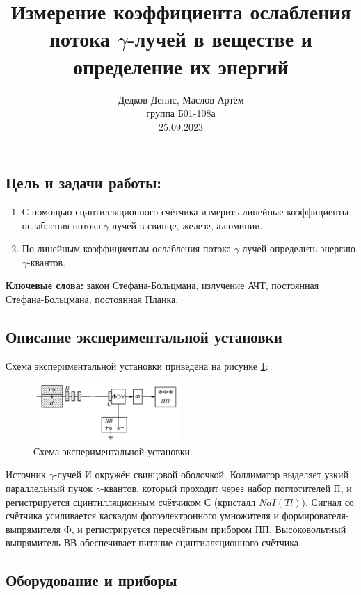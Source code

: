 \documentclass[10pt,a4paper]{article}
\author{\normalsize Дедков Денис, Маслов Артём \\
	\normalsize группа Б01-108а \\
	\normalsize 25.09.2023}
\date{}
\title{
	\Large Измерение коэффициента ослабления потока $\gamma$-лучей в веществе и определение их энергий \\ 
}
\begin{document}
\maketitle
	
	\subsection*{Цель и задачи работы:}
	\begin{enumerate}
		\item С помощью сцинтилляционного счётчика измерить линейные коэффициенты ослабления потока $\gamma$-лучей в свинце, железе, алюминии.
		
		\item По линейным коэффициентам ослабления потока $\gamma$-лучей определить энергию $\gamma$-квантов.
	\end{enumerate}
	
	\textbf{Ключевые слова:} закон Стефана-Больцмана, излучение АЧТ, постоянная Стефана-Больцмана, постоянная Планка.
	
	\subsection*{Описание экспериментальной установки}
	
	Схема экспериментальной установки приведена на рисунке \ref{img:exp_scheme}:
	\begin{figure}[H]
		\centering
		\includegraphics[width=0.5\textwidth]{images/exp_scheme.png}
		\caption{Схема экспериментальной установки.}
		\label{img:exp_scheme}
	\end{figure}

	Источник $\gamma$-лучей И окружён свинцовой оболочкой. Коллиматор выделяет узкий параллельный пучок $\gamma$-квантов, который проходит через набор поглотителей П, и регистрируется сцинтилляционным счётчиком С (кристалл $NaI(Tl)$). Сигнал со счётчика усиливается каскадом фотоэлектронного умножителя и формирователя-выпрямителя Ф, и регистрируется пересчётным прибором ПП. Высоковольтный выпрямитель ВВ обеспечивает питание сцинтилляционного счётчика.
	
	\subsection*{Оборудование и приборы}
	
\end{document}
